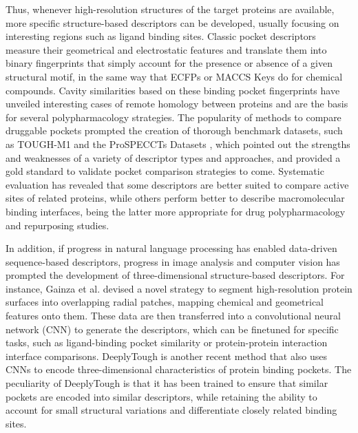 Thus, whenever high-resolution structures of the target proteins are available, more specific structure-based descriptors can be developed, usually focusing on interesting regions such as ligand binding sites. Classic pocket descriptors measure their geometrical and electrostatic features and translate them into binary fingerprints that simply account for the presence or absence of a given structural motif, in the same way that ECFPs or MACCS Keys do for chemical compounds\cite{weill_alignment-free_2010, siragusa_biogps_2015, rogers_extended-connectivity_2010, durant_reoptimization_2002}. Cavity similarities based on these binding pocket fingerprints have unveiled interesting cases of remote homology between proteins \cite{stark_model_2003} and are the basis for several polypharmacology strategies\cite{duran-frigola_detecting_2017, chaudhari_up--date_2020}. The popularity of methods to compare druggable pockets prompted the creation of thorough benchmark datasets, such as TOUGH-M1\cite{govindaraj_comparative_2018} and the ProSPECCTs Datasets \cite{ehrt_benchmark_2018}, which pointed out the strengths and weaknesses of a variety of descriptor types and approaches, and provided a gold standard to validate pocket comparison strategies to come. Systematic evaluation has revealed that some descriptors are better suited to compare active sites of related proteins, while others perform better to describe macromolecular binding interfaces, being the latter more appropriate for drug polypharmacology and repurposing studies\cite{ehrt_binding_2019}.




In addition, if progress in natural language processing has enabled data-driven sequence-based descriptors, progress in image analysis and computer vision has prompted the development of three-dimensional structure-based descriptors. For instance, Gainza et al. \cite{gainza_deciphering_2020} devised a novel strategy to segment high-resolution protein surfaces into overlapping radial patches, mapping chemical and geometrical features onto them. These data are then transferred into a convolutional neural network (CNN) to generate the descriptors, which can be finetuned for specific tasks, such as ligand-binding pocket similarity or protein-protein interaction interface comparisons. DeeplyTough is another recent method that also uses CNNs to encode three-dimensional characteristics of protein binding pockets\cite{simonovsky_deeplytough_2020}. The peculiarity of DeeplyTough is that it has been trained to ensure that similar pockets are encoded into similar descriptors, while retaining the ability to account for small structural variations and differentiate closely related binding sites.

